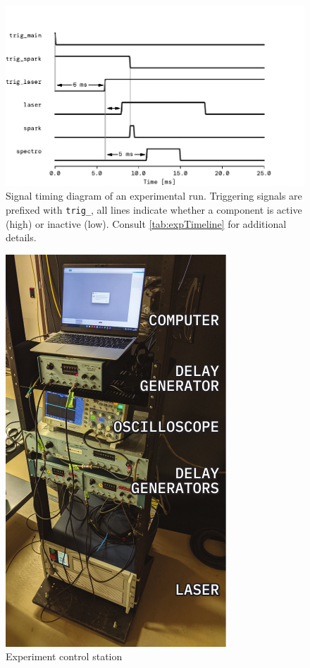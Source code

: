                 \begin{figure}[h]
                    \centering
                    \includegraphics[]{assets/3 design/timings.pdf}
                    \caption[Signal timing diagram of an experimental run]{Signal timing diagram of an experimental run. Triggering signals are prefixed with \texttt{trig\_}, all lines indicate whether a component is active (high) or inactive (low). Consult \autoref{tab:expTimeline} for additional details.}
                    \label{fig:timings}
                \end{figure}
                
                \begin{figure}
                    \centering
                    \includegraphics{assets/3 design/setupPhoto_control.pdf}
                    \caption{Experiment control station}
                    \label{fig:setupPhoto_controls}
                \end{figure}

